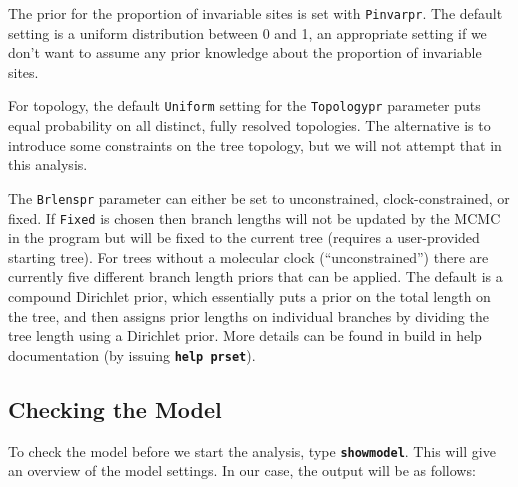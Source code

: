 \documentclass[12pt]{book}
\newcommand{\ttt}[1]{\texttt{#1}}
\newcommand{\tb}[1]{\ttt{\textbf{#1}}}
\begin{document}
The prior for the proportion of invariable sites is set with \ttt{Pinvarpr}. The default setting
is a uniform distribution between 0 and 1, an appropriate setting if we don't want to assume any
prior knowledge about the proportion of invariable sites.

For topology, the default \ttt{Uniform} setting for the \ttt{Topologypr} parameter puts equal
probability on all distinct, fully resolved topologies. The alternative is to introduce some
constraints on the tree topology, but we will not attempt that in this analysis.

The \ttt{Brlenspr} parameter can either be set to unconstrained, clock-constrained, or fixed. If
\ttt{Fixed} is chosen then branch lengths will not be updated by the MCMC in the program but
will be fixed to the current tree (requires a user-provided starting tree).
For trees without a molecular clock (``unconstrained'') there are currently five different branch
length priors that can be applied. The default is a compound Dirichlet prior, which essentially
puts a prior on the total length on the tree, and then assigns prior lengths on individual branches
by dividing the tree length using a Dirichlet prior.
More details can be found in build in help documentation (by issuing \tb{help prset}).


\subsection{Checking the Model}

To check the model before we start the analysis, type \tb{showmodel}. This will give an
overview of the model settings. In our case, the output will be as follows:
\end{document}
